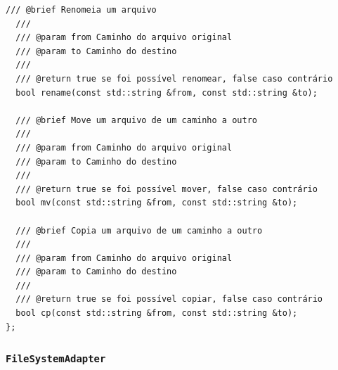\documentclass[
    12pt,				%
    oneside,   	        %
    a4paper,			%
    english,			%
    french,				%
    spanish,			%
    brazil,				%
    ]{pacotes/abntex2}
\begin{document}
\begin{lstlisting}[caption={Classe que expõe as interfaces de interação com o sistema de arquivos}, label={lst:fatfs}]
  /// @brief Renomeia um arquivo
  ///
  /// @param from Caminho do arquivo original
  /// @param to Caminho do destino
  ///
  /// @return true se foi possível renomear, false caso contrário
  bool rename(const std::string &from, const std::string &to);

  /// @brief Move um arquivo de um caminho a outro
  ///
  /// @param from Caminho do arquivo original
  /// @param to Caminho do destino
  ///
  /// @return true se foi possível mover, false caso contrário
  bool mv(const std::string &from, const std::string &to);

  /// @brief Copia um arquivo de um caminho a outro
  ///
  /// @param from Caminho do arquivo original
  /// @param to Caminho do destino
  ///
  /// @return true se foi possível copiar, false caso contrário
  bool cp(const std::string &from, const std::string &to);
};
\end{lstlisting}

\subsubsection{\texttt{FileSystemAdapter}}
\label{subsubsec:file_system_adapter}
\end{document}
